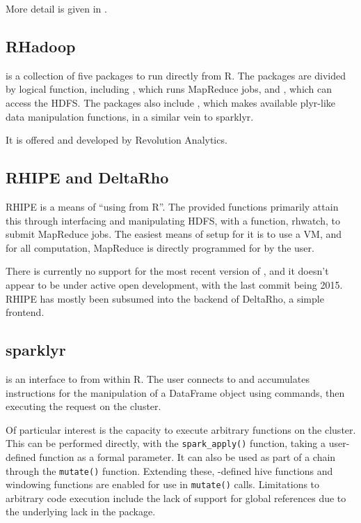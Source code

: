 More detail is given in \cite{pbdBASEvignette}.

\hypertarget{sec:rhadoop}{%
    \subsection{RHadoop}\label{sec:rhadoop}}

  is a collection of five packages to run  directly from
R\cite{analytics:_rhadoop_wiki}. The packages are divided by logical
function, including , which runs MapReduce jobs, and , which
can access the HDFS. The packages also include , which makes
available plyr-like data manipulation functions, in a similar vein to
{sparklyr}.

It is offered and developed by Revolution Analytics.

\hypertarget{sec:rhipe-deltarho}{%
    \subsection{RHIPE and DeltaRho}\label{sec:rhipe-deltarho}}

RHIPE is a means of ``using  from R''\cite{deltarho:_rhipe}. The
provided functions primarily attain this through interfacing and
manipulating HDFS, with a function, rhwatch, to submit MapReduce jobs.
The easiest means of setup for it is to use a VM, and for all 
computation, MapReduce is directly programmed for by the user.

There is currently no support for the most recent version of , and
it doesn't appear to be under active open development, with the last
commit being 2015. RHIPE has mostly been subsumed into the backend of
DeltaRho, a simple frontend.

\hypertarget{sparklyr}{%
    \subsection{sparklyr}\label{sparklyr}}

 is an interface to  from within R\cite{luraschi20}. The
user connects to  and accumulates instructions for the manipulation
of a  DataFrame object using  commands, then executing the
request on the  cluster.

Of particular interest is the capacity to execute arbitrary \R functions
on the  cluster. This can be performed directly, with the
\texttt{spark_apply()} function, taking a
user-defined function as a formal parameter. It can also be used as part
of a  chain through the \texttt{mutate()}
function. Extending these, -defined hive functions and windowing
functions are enabled for use in
\texttt{mutate()} calls. Limitations to
arbitrary code execution include the lack of support for global
references due to the underlying lack in the  package.

